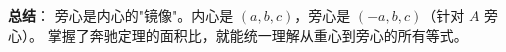 \begin{summarybox}
\textbf{总结}：
旁心是内心的"镜像"。内心是 $(a, b, c)$，旁心是 $(-a, b, c)$（针对 $A$ 旁心）。
掌握了奔驰定理的面积比，就能统一理解从重心到旁心的所有等式。
\end{summarybox}